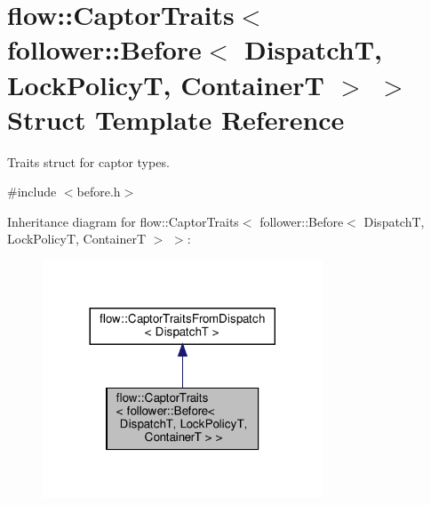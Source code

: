 \hypertarget{structflow_1_1_captor_traits_3_01follower_1_1_before_3_01_dispatch_t_00_01_lock_policy_t_00_01_container_t_01_4_01_4}{}\section{flow\+:\+:Captor\+Traits$<$ follower\+:\+:Before$<$ DispatchT, Lock\+PolicyT, ContainerT $>$ $>$ Struct Template Reference}
\label{structflow_1_1_captor_traits_3_01follower_1_1_before_3_01_dispatch_t_00_01_lock_policy_t_00_01_container_t_01_4_01_4}


Traits struct for captor types.  




{\ttfamily \#include $<$before.\+h$>$}



Inheritance diagram for flow\+:\+:Captor\+Traits$<$ follower\+:\+:Before$<$ DispatchT, Lock\+PolicyT, ContainerT $>$ $>$\+:
\nopagebreak
\begin{figure}[H]
\begin{center}
\leavevmode
\includegraphics[width=236pt]{structflow_1_1_captor_traits_3_01follower_1_1_before_3_01_dispatch_t_00_01_lock_policy_t_00_01_c5b20bbb34db06a6d5352d7cf896a6c3e}
\end{center}
\end{figure}


